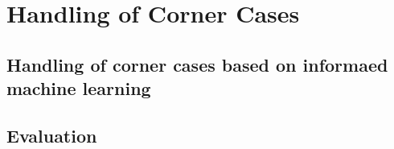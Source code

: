 \chapter{Handling of Corner Cases}
\label{chap:handling}

\section{Handling of corner cases based on informaed machine learning}
\label{sec:sensorik}

\section{Evaluation}

